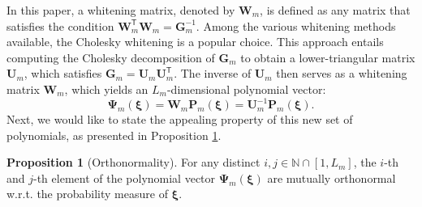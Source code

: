 \documentclass[journal]{IEEEtran}
\theoremstyle{definition}
\newtheorem{prop}{Proposition}
\theoremstyle{remark}
\begin{document}
In this paper, a whitening matrix, denoted by $\boldsymbol{W}_m$, is defined as any matrix that satisfies the condition $\boldsymbol{W}_m^{\mathsf{T}}\boldsymbol{W}_m=\boldsymbol{G}_m^{-1}$. Among the various whitening methods available, the Cholesky whitening is a popular choice. This approach entails computing the Cholesky decomposition of $\boldsymbol{G}_m$ to obtain a lower-triangular matrix $\boldsymbol{U}_m$, which satisfies $\boldsymbol{G}_m=\boldsymbol{U}_m\boldsymbol{U}_m^\mathsf{T}$. The inverse of $\boldsymbol{U}_m$ then serves as a whitening matrix $\boldsymbol{W}_m$, which yields an $L_{m}$-dimensional polynomial vector:
\begin{equation}\label{eq:13}
    \boldsymbol{\Psi}_m(\boldsymbol{\xi})=\boldsymbol{W}_m\boldsymbol{P}_m(\boldsymbol{\xi})=\boldsymbol{U}_m^{-1}\boldsymbol{P}_m(\boldsymbol{\xi}).
\end{equation}
Next, we would like to state the appealing property of this new set of polynomials, as presented in Proposition \ref{prop:1}.
\begin{prop}[Orthonormality]\label{prop:1}
For any distinct $i,j\in\mathbb{N}\cap[1,L_{m}]$, the $i$-th and $j$-th element of the polynomial vector $\boldsymbol{\Psi}_m(\boldsymbol{\xi})$ are mutually orthonormal w.r.t. the probability measure of $\boldsymbol{\xi}$.
\end{prop}
\end{document}
